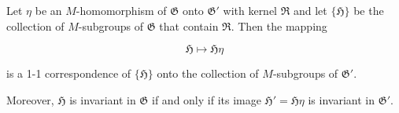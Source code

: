 Let $\eta$ be an $M$-homomorphism of $\mathfrak{G}$ onto $\mathfrak{G}'$ with kernel $\mathfrak{R}$ and let $\{\mathfrak{H}\}$ be the collection of $M$-subgroups of $\mathfrak{G}$ that contain $\mathfrak{R}$. Then the mapping

$$\mathfrak{H} \mapsto \mathfrak{H}\eta$$

is a 1-1 correspondence of $\{\mathfrak{H}\}$ onto the collection of $M$-subgroups of $\mathfrak{G}'$.

Moreover, $\mathfrak{H}$ is invariant in $\mathfrak{G}$ if and only if its image $\mathfrak{H}' = \mathfrak{H}\eta$ is invariant in $\mathfrak{G}'$.
